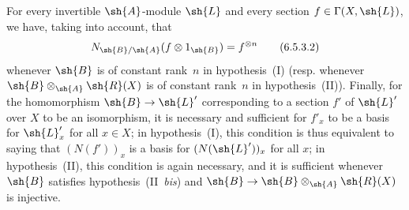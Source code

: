 \begin{env}[6.5.3]
For every invertible $\sh{A}$-module $\sh{L}$ and every section $f\in\Gamma(X,\sh{L})$, we have, taking  into account, that
\[
\label{II.6.5.3.2}
  N_{\sh{B}/\sh{A}}(f\otimes 1_{\sh{B}}) = f^{\otimes n}
\tag{6.5.3.2}
\]
whenever $\sh{B}$ is of constant rank~$n$ in hypothesis~(I) (resp. whenever $\sh{B}\otimes_{\sh{A}}\sh{R}(X)$ is of constant rank~$n$ in hypothesis~(II)).
Finally, for the homomorphism $\sh{B}\to\sh{L}'$ corresponding to a section $f'$ of $\sh{L}'$ over $X$ to be an isomorphism, it is necessary and sufficient for $f'_x$ to be a basis for $\sh{L}'_x$ for all $x\in X$;
in hypothesis~(I), this condition is thus equivalent to saying that $(N(f'))_x$ is a basis for $(N(\sh{L}'))_x$ for all $x$;
in hypothesis~(II), this condition is again necessary, and it is sufficient whenever $\sh{B}$ satisfies hypothesis~(II~\emph{bis}) and $\sh{B}\to\sh{B}\otimes_{\sh{A}}\sh{R}(X)$ is injective.
\end{env}

